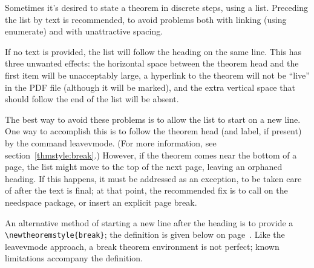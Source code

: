 \documentclass[11pt,twoside]{article}
\newcommand{\ntt}{%
  \fontfamily\ttdefault \fontseries\mddefault \fontshape\updefault
  \selectfont
}
\DeclareRobustCommand{\cn}[1]{{\ntt\bslchar#1}}
\DeclareRobustCommand{\pkg}[1]{{\ntt#1}}
\DeclareRobustCommand{\env}[1]{{\ntt#1}}
\begin{document}
Sometimes it's desired to state a theorem in discrete steps, using
a list.  Preceding the list by text is recommended, to avoid problems
both with linking (using \env{enumerate}) and with unattractive spacing.

If no text is provided, the list will follow the heading on the same
line.  This has three unwanted effects: the horizontal space between
the theorem head and the first item will be unacceptably large, a
hyperlink to the theorem will not be ``live'' in the PDF file
(although it will be marked), and the extra vertical space that should
follow the end of the list will be absent.

The best way to avoid these problems is to allow the list to start
on a new line.  One way to accomplish this is to follow the theorem
head (and \cn{label}, if present) by the command \cn{leavevmode}.
(For more information, see section~\ref{thmstyle:break}.) 
However, if the theorem comes near the bottom of a page, the list
might move to the top of the next page, leaving an orphaned heading.
If this happens, it must be addressed as an exception, to be taken
care of after the text is final; at that point, the recommended
fix is to call on the \pkg{needspace} \cite{NDS} package, or insert
an explicit page break.

An alternative method of starting a new line after the heading is to
provide a \verb+\newtheoremstyle{break}+; the definition is given below
on page~\pageref{thmstyle:break}.  Like the \cn{leavevmode} approach,
a \env{break} theorem environment is not perfect; known limitations
accompany the definition.



\end{document}
